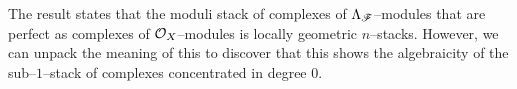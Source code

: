 \documentclass[11pt]{amsart}
\begin{document}
\begin{rmk}
The result \cite[Theorem 6.13]{GeomNonAbHodgeFilt} states that the moduli
stack of complexes of $\Lambda_\mathscr{F}$--modules that are perfect as complexes
of $\mathcal{O}_X$--modules is locally geometric $n$--stacks. However, we can unpack
the meaning of this to discover that this shows the algebraicity of the
sub--$1$--stack of complexes concentrated in degree $0$.
\end{rmk}

\end{document}
